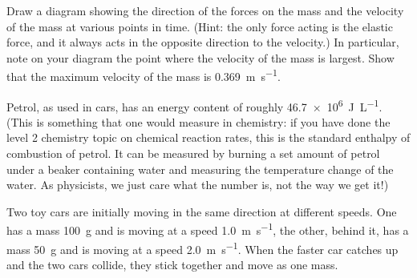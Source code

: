 \documentclass[answers]{exam}
\begin{document}
\begin{questions}
\begin{parts}
\begin{subparts}
          \subpart Draw a diagram showing the direction of the forces on the mass and the velocity of the mass at various points in time. (Hint: the
                   only force acting is the elastic force, and it always acts in the opposite direction to the velocity.) In particular, note
                   on your diagram the point where the velocity of the mass is largest.
          \subpart Show that the maximum velocity of the mass is \SI{0.369}{\metre\per\second}.
        \end{subparts}
    \end{parts}
  \question Petrol, as used in cars, has an energy content of roughly \SI{46.7e6}{\joule\per\liter}. (This is something that one
            would measure in chemistry: if you have done the level 2 chemistry topic on chemical reaction rates, this is the standard
            enthalpy of combustion of petrol. It can be measured by burning a set amount of petrol under a beaker containing water
            and measuring the temperature change of the water. As physicists, we just care what the number is, not the way we get it!)
  \question Two toy cars are initially moving in the same direction at different speeds. One has a mass \SI{100}{\gram} and is moving
            at a speed \SI{1.0}{\metre\per\second}, the other, behind it, has a mass \SI{50}{\gram} and is moving at a speed \SI{2.0}{\metre\per\second}.
            When the faster car catches up and the two cars collide, they stick together and move as one mass.
    \begin{parts}

\end{parts}
\end{questions}
\end{document}
